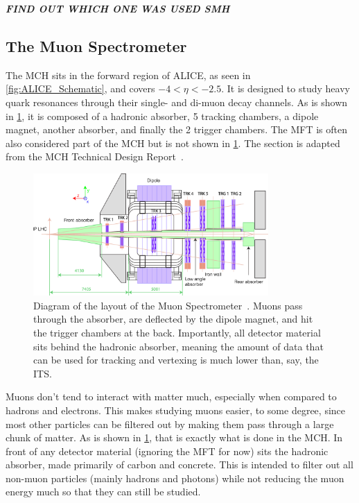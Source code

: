\textbf{\textit{FIND OUT WHICH ONE WAS USED SMH}}




\subsection{The Muon Spectrometer}
The MCH sits in the forward region of ALICE, as seen in \cref{fig:ALICE_Schematic}, and covers $-4<\eta<-2.5$. It is designed to study heavy quark resonances through their single- and di-muon decay channels. As is shown in \cref{fig:Muon Spectrometer}, it is composed of a hadronic absorber, 5 tracking chambers, a dipole magnet, another absorber, and finally the 2 trigger chambers. The MFT is often also considered part of the MCH but is not shown in \cref{fig:Muon Spectrometer}. The section is adapted from the MCH Technical Design Report~\cite{MCH_TDR}.

\begin{figure}[ht]
    \begin{center}
        \includegraphics[width=0.8\textwidth]{Figs/MCH_schematic_pog.png}
        \caption{Diagram of the layout of the Muon Spectrometer~\cite{Muon_Spec_Schematic}. Muons pass through the absorber, are deflected by the dipole magnet, and hit the trigger chambers at the back. Importantly, all detector material sits behind the hadronic absorber, meaning the amount of data that can be used for tracking and vertexing is much lower than, say, the ITS.}
        \label{fig:Muon Spectrometer}
    \end{center}
\end{figure}

Muons don't tend to interact with matter much, especially when compared to hadrons and electrons. This makes studying muons easier, to some degree, since most other particles can be filtered out by making them pass through a large chunk of matter. As is shown in \cref{fig:Muon Spectrometer}, that is exactly what is done in the MCH. In front of any detector material (ignoring the MFT for now) sits the hadronic absorber, made primarily of carbon and concrete. This is intended to filter out all non-muon particles (mainly hadrons and photons) while not reducing the muon energy much so that they can still be studied. 


